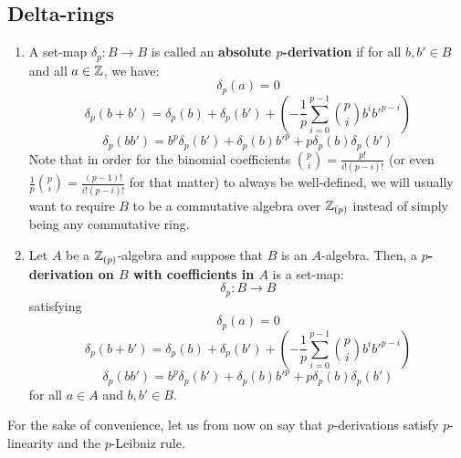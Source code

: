         \subsection{Delta-rings}
            \begin{definition}[$p$-derivations] \label{def: p_derivations}
                \noindent
                \begin{enumerate}
                    \item A set-map $\delta_p: B \to B$ is called an \textbf{absolute $p$-derivation} if for all $b, b' \in B$ and all $a \in \mathbb{Z}$, we have:
                        $$\delta_p(a) = 0$$
                        $$\delta_p(b + b') = \delta_p(b) + \delta_p(b') + \left(-\frac1p\sum_{i=0}^{p-1} \binom{p}{i} b^ib'^{p-i}\right)$$
                        $$\delta_p(bb') = b^p\delta_p(b') + \delta_p(b)b'^p + p\delta_p(b)\delta_p(b')$$
                    Note that in order for the binomial coefficients $\binom{p}{i} = \frac{p!}{i! (p - i)!}$ (or even $\frac1p \binom{p}{i} = \frac{(p - 1)!}{i! (p - i)!}$ for that matter) to always be well-defined, we will usually want to require $B$ to be a commutative algebra over $\mathbb{Z}_{(p)}$ instead of simply being any commutative ring. 
                    \item Let $A$ be a $\mathbb{Z}_{(p)}$-algebra and suppose that $B$ is an $A$-algebra. Then, a \textbf{$p$-derivation on $B$ with coefficients in $A$} is a set-map:
                        $$\delta_p: B \to B$$
                    satisfying
                        $$\delta_p(a) = 0$$
                        $$\delta_p(b + b') = \delta_p(b) + \delta_p(b') + \left(-\frac1p\sum_{i=0}^{p-1} \binom{p}{i} b^ib'^{p-i}\right)$$
                        $$\delta_p(bb') = b^p\delta_p(b') + \delta_p(b)b'^p + p\delta_p(b)\delta_p(b')$$
                    for all $a \in A$ and $b, b' \in B$.
                \end{enumerate}
            \end{definition}
            \begin{convention}
                For the sake of convenience, let us from now on say that $p$-derivations satisfy $p$-linearity and the $p$-Leibniz rule.
            \end{convention}
            
